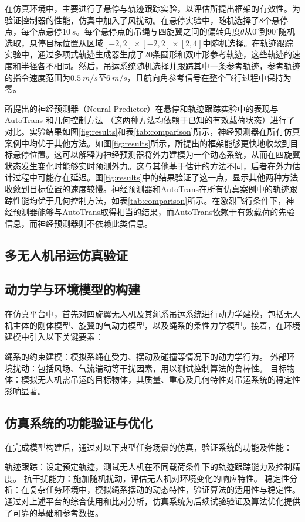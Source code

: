 \documentclass[lang=chs, degree=master, blindreview=false, winfonts=true]{yanputhesis}
\begin{document}
在仿真环境中，主要进行了悬停与轨迹跟踪实验，以评估所提出框架的有效性。为验证控制器的性能，仿真中加入了风扰动。在悬停实验中，随机选择了8个悬停点，每个点悬停$10 \ s$。每个悬停点的吊绳与四旋翼之间的偏转角度$\theta$从$0^\circ$到$90^\circ$随机选取，悬停目标位置从区域$[-2, 2] \times [-2, 2] \times [2, 4]$中随机选择。在轨迹跟踪实验中，通过多项式轨迹生成器生成了20条圆形和双叶形参考轨迹，这些轨迹的速度和半径各不相同。然后，吊运系统随机选择并跟踪其中一条参考轨迹，参考轨迹的指令速度范围为$0.5 \ m/s$至$6 \ m/s$，且航向角参考信号在整个飞行过程中保持为零。

所提出的神经预测器（Neural Predictor）在悬停和轨迹跟踪实验中的表现与AutoTrans \cite{autotrans}和几何控制方法 \cite{geometric_control}（这两种方法均依赖于已知的有效载荷状态）进行了对比。实验结果如图\ref{fig:results}和表\ref{tab:comparison}所示，神经预测器在所有仿真案例中均优于其他方法。如图\ref{fig:results}所示，所提出的框架能够更快地收敛到目标悬停位置。这可以解释为神经预测器将外力建模为一个动态系统，从而在四旋翼状态发生变化时能够实时预测外力。这与其他基于估计的方法不同，后者在外力估计过程中可能存在延迟。图\ref{fig:results}中的结果验证了这一点，显示其他两种方法收敛到目标位置的速度较慢。神经预测器和AutoTrans在所有仿真案例中的轨迹跟踪性能均优于几何控制方法，如表\ref{tab:comparison}所示。在激烈飞行条件下，神经预测器能够与AutoTrans取得相当的结果，而AutoTrans依赖于有效载荷的先验信息，而神经预测器则不依赖此类信息。

\subsection{多无人机吊运仿真验证}
\subsection{动力学与环境模型的构建}
在仿真平台中，首先对四旋翼无人机及其绳系吊运系统进行动力学建模，包括无人机主体的刚体模型、旋翼的气动力模型，以及绳系的柔性力学模型。接着，在环境建模中引入以下关键要素：

绳系的约束建模：模拟系绳在受力、摆动及碰撞等情况下的动力学行为。
外部环境扰动：包括风场、气流湍动等干扰因素，用以测试控制算法的鲁棒性。
目标物体：模拟无人机需吊运的目标物体，其质量、重心及几何特性对吊运系统的稳定性影响显著。
\subsection{仿真系统的功能验证与优化}
在完成模型构建后，通过对以下典型任务场景的仿真，验证系统的功能及性能：

轨迹跟踪：设定预定轨迹，测试无人机在不同载荷条件下的轨迹跟踪能力及控制精度。
抗干扰能力：施加随机扰动，评估无人机对环境变化的响应特性。
稳定性分析：在复杂任务环境中，模拟绳系摆动的动态特性，验证算法的适用性与稳定性。
通过对上述平台的综合使用和比对分析，仿真系统为后续试验验证及算法优化提供了可靠的基础和参考数据。
\end{document}
